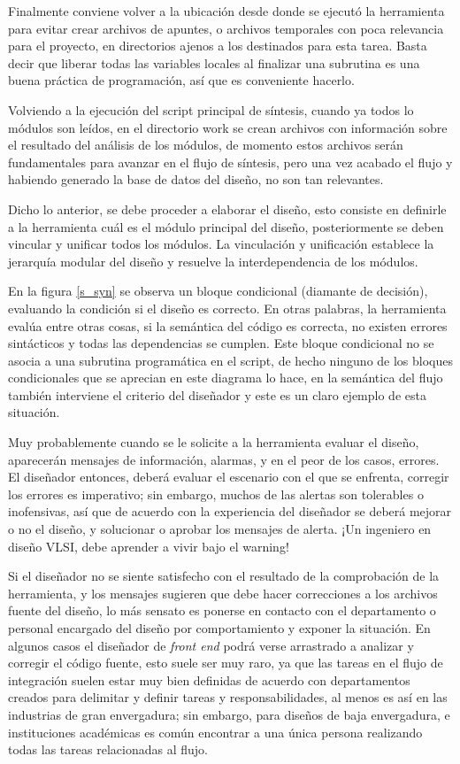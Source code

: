 Finalmente conviene volver a la ubicación desde donde se ejecutó la herramienta para evitar crear archivos de apuntes, o archivos temporales con poca relevancia para el proyecto, en directorios ajenos a los destinados para esta tarea. Basta decir que liberar todas las variables locales al finalizar una subrutina es una buena práctica de programación, así que es conveniente hacerlo.

Volviendo a la ejecución del script principal de síntesis, cuando ya todos lo módulos son leídos, en el directorio work se crean archivos con información sobre el resultado del análisis de los módulos, de momento estos archivos serán fundamentales para avanzar en el flujo de síntesis, pero una vez acabado el flujo y habiendo generado la base de datos del diseño, no son tan relevantes.


Dicho lo anterior, se debe proceder a elaborar el diseño, esto consiste en definirle a la herramienta cuál es el módulo principal del diseño, posteriormente se deben vincular y unificar todos los módulos. La vinculación y unificación establece la jerarquía modular del diseño y resuelve la interdependencia de los módulos.

En la figura \ref{s_syn} se observa un bloque condicional (diamante de decisión), evaluando la condición si el diseño es correcto. En otras palabras, la herramienta evalúa entre otras cosas, si la semántica del código es correcta, no existen errores sintácticos y todas las dependencias se cumplen. Este bloque condicional no se asocia a una subrutina programática en el script, de hecho ninguno de los bloques condicionales que se aprecian en este diagrama lo hace, en la semántica del flujo también interviene el criterio del diseñador y este es un claro ejemplo de esta situación.

Muy probablemente cuando se le solicite a la herramienta evaluar el diseño, aparecerán mensajes de información, alarmas, y en el peor de los casos, errores. El diseñador entonces, deberá evaluar el escenario con el que se enfrenta, corregir los errores es imperativo; sin embargo, muchos de las alertas son tolerables o inofensivas, así que de acuerdo con la experiencia del diseñador se deberá mejorar o no el diseño, y solucionar o aprobar los mensajes de alerta. ¡Un ingeniero en diseño VLSI, debe aprender a vivir bajo el warning!


Si el diseñador no se siente satisfecho con el resultado de la comprobación de la herramienta, y los mensajes sugieren que debe hacer correcciones a los archivos fuente del diseño, lo más sensato es ponerse en contacto con el departamento o personal encargado del diseño por comportamiento y exponer la situación. En algunos casos el diseñador de \textit{front end} podrá verse arrastrado a analizar y corregir el código fuente, esto suele ser muy raro, ya que las tareas en el flujo de integración suelen estar muy bien definidas de acuerdo con departamentos creados para delimitar y definir tareas y responsabilidades, al menos es así en las industrias de gran envergadura; sin embargo, para diseños de baja envergadura, e instituciones académicas es común encontrar a una única persona realizando todas las tareas relacionadas al flujo.

